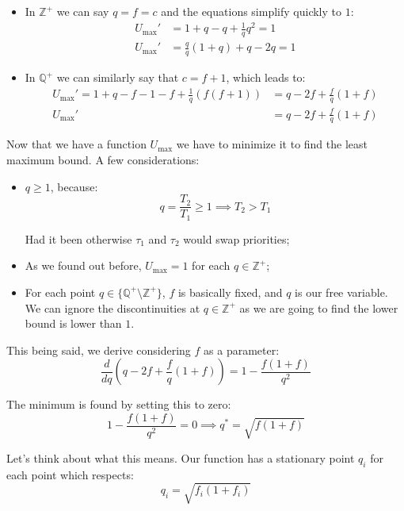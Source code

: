 \documentclass[a4paper,11pt]{article}
\begin{document}
\begin{itemize}
	\item In $\mathbb{Z}^+$ we can say $q = f = c$ and the equations simplify quickly to $1$:
	      $$
		      \begin{aligned}
			      U_\text{max}' & = 1 + q - q + \frac{1}{q} q^2 = 1 \\
			      U_\text{max}' & = \frac{q}{q}(1 + q) + q - 2q = 1
		      \end{aligned}
	      $$

	\item In $\mathbb{Q}^+$ we can similarly say that $c = f + 1$, which leads to:
	      $$
		      \begin{aligned}
			      U_\text{max}' = 1 + q - f - 1 - f + \frac{1}{q} \left( f (f + 1) \right) & = q - 2f + \frac{f}{q} \left( 1 + f \right) \\
			      U_\text{max}'                                                            & =   q - 2f + \frac{f}{q} ( 1 + f )
		      \end{aligned}
	      $$
\end{itemize}

Now that we have a function $U_\text{max}$ we have to minimize it to find the least maximum bound.
A few considerations:
\begin{itemize}
	\item $q \geq 1$, because:
	      $$
		      q = \frac{T_2}{T_1} \geq 1 \implies T_2 > T_1
	      $$

	      Had it been otherwise $\tau_1$ and $\tau_2$ would swap priorities;
	\item As we found out before, $U_\text{max} = 1$ for each $q \in \mathbb{Z}^+$;
	\item For each point $q \in \{ \mathbb{Q}^+ \setminus \mathbb{Z}^+ \}$, $f$ is basically fixed, and $q$ is our free variable. We can ignore the discontinuities at $q \in \mathbb{Z}^+$ as we are going to find the lower bound is lower than $1$.
\end{itemize}

This being said, we derive considering $f$ as a parameter:
$$
	\frac{d}{dq} \left( q - 2f + \frac{f}{q}(1 + f) \right) = 1 - \frac{f(1+f)}{q^2}
$$

The minimum is found by setting this to zero:
$$
	1 - \frac{f(1+f)}{q^2} = 0 \implies q^* = \sqrt{f(1 + f)}
$$

Let's think about what this means.
Our function has a stationary point $q_i$ for each point which respects:
$$
	q_i = \sqrt{f_i(1 + f_i)}
$$
\end{document}
